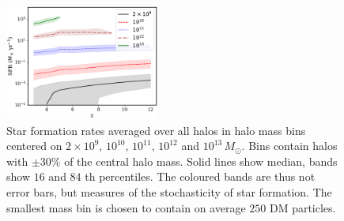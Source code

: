 \documentclass[fleqn,usenatbib]{mnras}
\def\msun{\, M_{\odot}}
\newcommand{\spb}[1]{\textcolor{red}{[\bf SPB: #1]}}
\newcommand{\yueying}[1]{\textcolor{magenta}{[\bf YN: #1]}}
\begin{document}

\begin{figure}
\centering
  \includegraphics[width=0.45\textwidth]{plots/avg_sfr.pdf}
  \caption{Star formation rates averaged over all halos in halo mass bins centered on $2\times 10^9$, $10^{10}$, $10^{11}$, $10^{12}$ and $10^{13} \msun$. Bins contain halos with $\pm 30\%$ of the central halo mass. Solid lines show median, bands show $16$ and $84$ th percentiles. The coloured bands are thus not error bars, but measures of the stochasticity of star formation. The smallest mass bin is chosen to contain on average $250$ DM particles.}
  \label{fig:avgsfr}
\end{figure}
\end{document}
